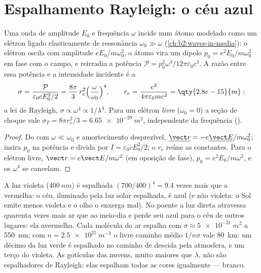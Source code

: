 \section{Espalhamento Rayleigh: o céu azul}

\begin{proposition}\label{prop:b2:dipole-radiation:rayleigh}
Uma onda de amplitude $E_0$ e frequência $\omega$ incide num átomo modelado
como um elétron ligado elasticamente de ressonância $\omega_0 \gg \omega$
(\cref{ch:b2:waves-in-media}): o elétron oscila com amplitude
$eE_0/m\omega_0^2$, o átomo vira um dipolo $p_0 = e^2E_0/m\omega_0^2$ em fase
com o campo, e reirradia a potência $\mathcal P = p_0^2\omega^4/12\pi
\varepsilon_0c^3$. A razão entre essa potência e a intensidade incidente é a
\emph{}
\[
\sigma = \frac{\mathcal P}{\varepsilon_0cE_0^2/2} = \frac{8\pi}3\,r_e^2\Bigl(\frac\omega{\omega_0}\Bigr)^4 ,
\qquad r_e = \frac{e^2}{4\pi\varepsilon_0mc^2} = \qty{2.8e-15}{m} :
\]
a lei de Rayleigh, $\sigma \propto \omega^4 \propto 1/\lambda^4$. Para um elétron
\emph{livre} ($\omega_0 = 0$) a seção de choque vale $\sigma_T = 8\pi r_e^2/3 =
\qty{6.65e-29}{m^2}$, independente da frequência ().
\end{proposition}

\begin{proof}
Do  com $\omega \ll \omega_0$ e amortecimento desprezível,
$\underline{\vect r} = -e\underline{\vect E}/m\omega_0^2$; insira $p_0$ na potência e
divida por $I = \varepsilon_0cE_0^2/2$; o $r_e$ reúne as constantes. Para o elétron
livre, $\vect r = e\vect E/m\omega^2$ (em oposição de fase), $p_0 = e^2E_0/m\omega^2$, e
os $\omega^4$ se cancelam.
\end{proof}

\begin{example}\label{ex:b2:dipole-radiation:sky}
A luz violeta ($\qty{400}{nm}$) é espalhada $(700/400)^4 = 9.4$ vezes mais
que a vermelha: o céu, iluminado pela luz solar espalhada, é azul (e não violeta: o
Sol emite menos violeta e o olho o enxerga mal). No poente a luz
direta atravessa quarenta vezes mais ar que ao meio-dia e perde seu azul para o
céu de outros lugares: ela avermelha. Cada molécula do ar espalha com
$\sigma \approx \qty{5e-31}{m^2}$ a \qty{550}{nm}; com $n = \qty{2.5e25}{m^{-3}}$ o
livre caminho médio $1/n\sigma$ vale \qty{80}{km}: um décimo da luz verde é
espalhado no caminho de descida pela atmosfera, e um terço do
violeta. As gotículas das nuvens, muito maiores que $\lambda$, não são espalhadores
de Rayleigh: elas espalham todas as cores igualmente --- branco.
\end{example}

